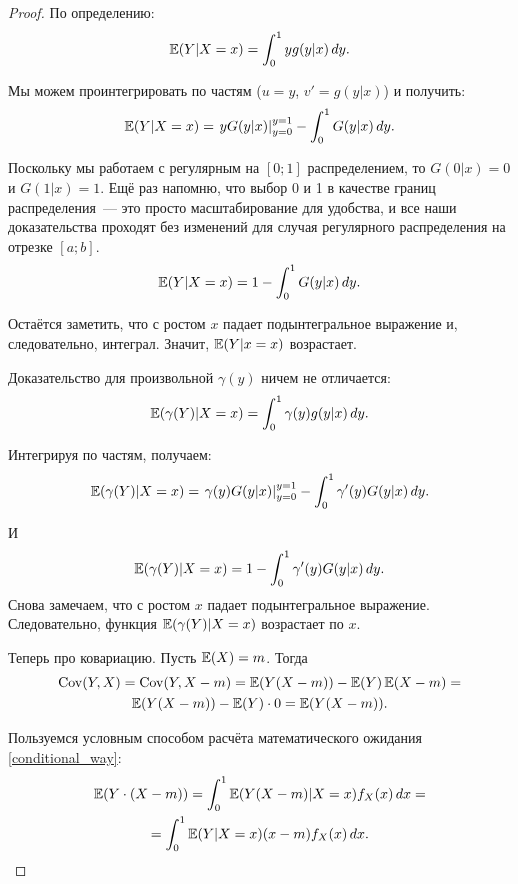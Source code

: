 \begin{proof}
По определению:
\begin{equation}
\operatorname{\mathbb{E}}(Y|X=x)=\int_{0}^{1}yg(y|x) \, dy.
\end{equation}

Мы можем проинтегрировать по частям ($ u=y $, $ v'=g(y|x) $) и получить:
\begin{equation}
\operatorname{\mathbb{E}}(Y|X=x)=\left.yG(y|x)\right|_{y=0}^{y=1} - \int_{0}^{1}G(y|x) \, dy.
\end{equation}

Поскольку мы работаем с регулярным на $ [0;1] $ распределением, то $ G(0|x)=0 $ и $ G(1|x)=1 $. Ещё раз напомню, что выбор 0 и 1 в качестве границ распределения~— это просто масштабирование для удобства, и все наши доказательства проходят без изменений для случая регулярного распределения на отрезке $ [a;b] $.
\begin{equation}
\operatorname{\mathbb{E}}(Y|X=x)=1 - \int_{0}^{1}G(y|x) \, dy.
\end{equation}

Остаётся заметить, что с ростом $ x $ падает подынтегральное выражение и, следовательно, интеграл. Значит, $ \operatorname{\mathbb{E}}(Y|x=x) $ возрастает.

Доказательство для произвольной $ \gamma(y) $ ничем не отличается:
\begin{equation}
\operatorname{\mathbb{E}}(\gamma(Y)|X=x)=\int_{0}^{1}\gamma(y)g(y|x) \, dy.
\end{equation}

Интегрируя по частям, получаем:
\begin{equation}
\operatorname{\mathbb{E}}(\gamma(Y)|X=x)=\left.\gamma(y)G(y|x)\right|_{y=0}^{y=1} - \int_{0}^{1}\gamma'(y)G(y|x) \, dy.
\end{equation}

И
\begin{equation}
\operatorname{\mathbb{E}}(\gamma(Y)|X=x)=1 - \int_{0}^{1}\gamma'(y)G(y|x) \, dy.
\end{equation}
Снова замечаем, что с ростом $ x $ падает подынтегральное выражение. Следовательно, функция $ \operatorname{\mathbb{E}}(\gamma(Y)|X=x) $ возрастает по $x$.


Теперь про ковариацию. Пусть $ \operatorname{\mathbb{E}}(X)=m $. Тогда
\begin{multline}
\operatorname{Cov}(Y,X)=\operatorname{Cov}(Y,X-m)=\operatorname{\mathbb{E}}(Y(X-m))-\operatorname{\mathbb{E}}(Y)\operatorname{\mathbb{E}}(X-m)=\\
\operatorname{\mathbb{E}}(Y(X-m))-\operatorname{\mathbb{E}}(Y)\cdot 0=\operatorname{\mathbb{E}}(Y(X-m)).
\end{multline}

Пользуемся условным способом расчёта математического ожидания \ref{conditional_way}:
\begin{multline} \index{условное математическое ожидание}
\E(Y\cdot (X-m))=\int_{0}^{1} \E(Y(X-m)|X=x)f_{X}(x) \, dx=\\
=\int_{0}^{1}\E(Y|X=x)(x-m)f_{X}(x) \, dx.
\end{multline}


\end{proof}
